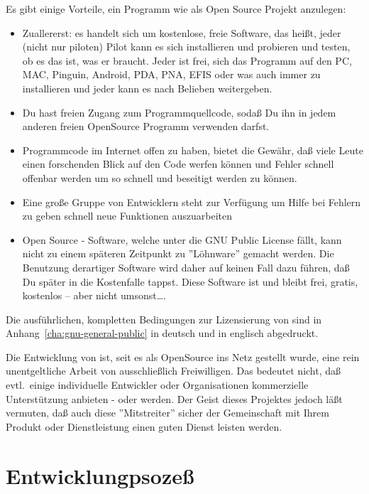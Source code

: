Es gibt einige Vorteile, ein Programm wie \xc als Open Source Projekt anzulegen:

\begin{itemize}
\item Zuallererst: es handelt sich um kostenlose, freie Software, das heißt, jeder (nicht nur piloten) Pilot kann es sich installieren und probieren und testen,
ob es das ist, was er braucht. Jeder ist frei, sich das Programm auf den PC, MAC, Pinguin, Android, PDA, PNA, EFIS  oder was auch immer zu installieren
und jeder kann es nach Belieben weitergeben.

\item Du hast freien Zugang zum Programmquellcode, sodaß Du ihn in jedem anderen freien OpenSource Programm verwenden darfst.

\item Programmcode im Internet offen zu haben, bietet die Gewähr, daß viele Leute einen forschenden Blick auf den Code werfen können und Fehler schnell offenbar
werden um so schnell und beseitigt werden zu können.

\item  Eine große Gruppe von Entwicklern steht zur Verfügung um Hilfe bei Fehlern zu geben schnell neue Funktionen auszuarbeiten

\item Open Source - Software, welche unter die GNU Public License fällt, kann nicht zu einem späteren Zeitpunkt zu ''Löhnware''
gemacht werden. Die Benutzung derartiger Software wird daher auf keinen Fall dazu führen, daß Du später in die Kostenfalle tappst.
Diese Software ist und bleibt frei, gratis, kostenlos -- aber nicht umsonst\dots.

\end{itemize}

Die ausführlichen, kompletten Bedingungen zur Lizensierung von \xc sind in Anhang~\ref{cha:gnu-general-public} in deutsch und in englisch abgedruckt.

Die Entwicklung von \xc ist, seit es als OpenSource ins Netz gestellt wurde, eine rein unentgeltliche Arbeit von ausschließlich Freiwilligen.
Das bedeutet nicht, daß evtl.\  einige individuelle Entwickler oder Organisationen  kommerzielle Unterstützung anbieten - oder werden.
Der Geist dieses Projektes jedoch läßt vermuten, daß auch diese  ''Mitstreiter'' sicher der Gemeinschaft
mit Ihrem Produkt oder Dienstleistung einen guten Dienst leisten werden.

\section{Entwicklungpsozeß}

